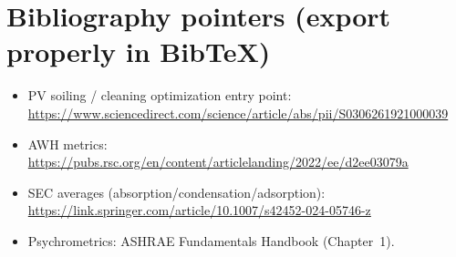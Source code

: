 \documentclass[11pt,a4paper]{article}
\begin{document}
\section{Bibliography pointers (export properly in Bib\TeX)}
\begin{itemize}[leftmargin=*]
  \item PV soiling / cleaning optimization entry point: \url{https://www.sciencedirect.com/science/article/abs/pii/S0306261921000039}
  \item AWH metrics: \url{https://pubs.rsc.org/en/content/articlelanding/2022/ee/d2ee03079a}
  \item SEC averages (absorption/condensation/adsorption): \url{https://link.springer.com/article/10.1007/s42452-024-05746-z}
  \item Psychrometrics: ASHRAE Fundamentals Handbook (Chapter~1).
\end{itemize}
\end{document}
